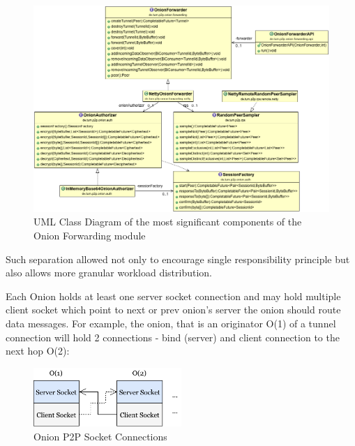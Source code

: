 \documentclass{article}
\begin{document}
\begin{figure}[H]
\centering
  \includegraphics[angle=90,height=1.45\textwidth]{cd-onion-fwd-auth-rps.png}
  \captionsetup{justification=centering}
  \caption{UML Class Diagram of the most significant components of the Onion Forwarding module}
\end{figure}

Such separation allowed not only to encourage single responsibility principle but also allows more granular workload distribution.

Each Onion holds at least one server socket connection and may hold multiple client socket which point to next or prev onion's server the onion should route data messages. For example, the onion, that is an originator O(1) of a tunnel connection will hold 2 connections - bind (server) and client connection to the next hop O(2):
\begin{figure}[H]
\centering
     \includegraphics[width=0.5\textwidth]{onion-sockets-connections.pdf}
      \caption{Onion P2P Socket Connections}
\end{figure}
\end{document}
